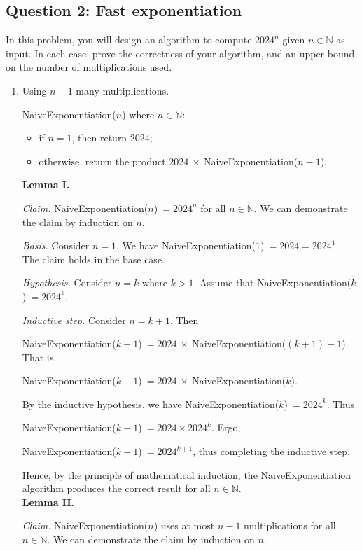 \subsection*{Question 2: Fast exponentiation}
In this problem, you will design an algorithm to compute $2024^n$ given $n \in \mathbb{N}$ as input. In each case, prove the correctness of your algorithm, and an upper bound on the number of multiplications used.
\begin{enumerate}
    \item Using $n-1$ many multiplications.
\begin{solution}
{\sc NaiveExponentiation}($n$) where $n\in\mathbb{N}$:
\begin{itemize}
\item if $n=1$, then return $2024$;
\item otherwise, return the product $2024~\times~${\sc NaiveExponentiation}($n-1$).
\end{itemize}
\textbf{Lemma I. }

\textit{Claim. }{\sc NaiveExponentiation}($n$)$~=2024^n$ for all $n\in\mathbb{N}$. We can demonstrate the claim by induction on $n$.

\textit{Basis. }Consider $n=1$. We have {\sc NaiveExponentiation}($1$)$~=2024=2024^1$. The claim holds in the base case.

\textit{Hypothesis. }Consider $n=k$ where $k>1$. Assume that {\sc NaiveExponentiation}($k$)$~=2024^k$.

\textit{Inductive step. }Consider $n=k+1$. Then

{\sc NaiveExponentiation}($k+1$)$~=2024~\times~${\sc NaiveExponentiation}($(k+1)-1$). That is,

{\sc NaiveExponentiation}($k+1$)$~=2024~\times~${\sc NaiveExponentiation}($k$).

By the inductive hypothesis, we have {\sc NaiveExponentiation}($k$)$~=2024^k$. Thus

{\sc NaiveExponentiation}($k+1$)$~=2024\times2024^k$. Ergo,

{\sc NaiveExponentiation}($k+1$)$~=2024^{k+1}$, thus completing the inductive step.

Hence, by the principle of mathematical induction, the {\sc NaiveExponentiation} algorithm produces the correct result for all $n\in\mathbb{N}$.\\

\textbf{Lemma II. }

\textit{Claim. }{\sc NaiveExponentiation}($n$) uses at most $n-1$ multiplications for all $n\in\mathbb{N}$. We can demonstrate the claim by induction on $n$.


\end{solution}
\end{enumerate}
